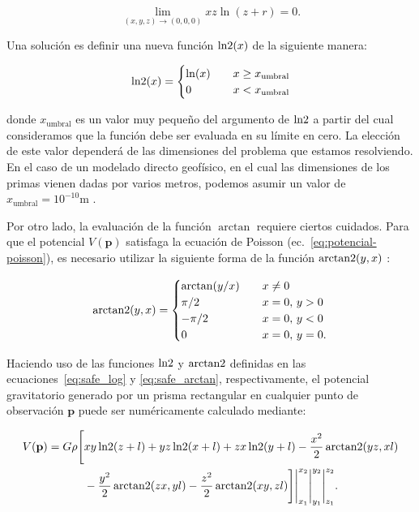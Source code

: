 \begin{equation}
    \lim_{(x, y, z)\rightarrow (0, 0, 0)} xz \ln(z + r) = 0.
\end{equation}

Una solución es definir una nueva función $\operatorname{ln2}(x)$ de la siguiente
manera:

\begin{equation}
    \operatorname{ln2}(x) =
    \begin{cases}
        \ln(x) & \quad x \ge x_\text{umbral} \\
        0      & \quad x < x_\text{umbral}
    \end{cases}
    \label{eq:safe_log}
\end{equation}

\noindent donde $x_\text{umbral}$ es un valor muy pequeño del argumento de
$\operatorname{ln2}$ a partir del cual consideramos que la función debe ser evaluada en
su límite en cero.
La elección de este valor dependerá de las dimensiones del problema que estamos
resolviendo.
En el caso de un modelado directo geofísico, en el cual las dimensiones de los
primas vienen dadas por varios metros, podemos asumir un valor de
$x_\text{umbral} = 10^{-10}$m \citep{harmonica2021}.

Por otro lado, la evaluación de la función $\arctan$ requiere ciertos cuidados.
Para que el potencial $V(\mathbf{p})$ satisfaga la ecuación de Poisson
(ec.~\ref{eq:potencial-poisson}), es necesario utilizar la siguiente forma de
la función $\operatorname{arctan2}(y, x)$ \citep{fukushima2020}:

\begin{equation}
    \operatorname{arctan2}(y, x) =
    \begin{cases}
        \arctan(y / x) & \quad x \ne 0 \\
        \pi / 2        & \quad x = 0,\, y > 0 \\
        -\pi / 2       & \quad x = 0,\, y < 0 \\
        0              & \quad x = 0,\, y = 0.
    \end{cases}
    \label{eq:safe_arctan}
\end{equation}

Haciendo uso de las funciones $\operatorname{ln2}$ y $\operatorname{arctan2}$ definidas en las
ecuaciones~\ref{eq:safe_log} y \ref{eq:safe_arctan}, respectivamente, el
potencial gravitatorio generado por un prisma rectangular en cualquier punto de
observación $\mathbf{p}$ puede ser numéricamente calculado mediante:

\begin{equation}
    \begin{split}
        V(\mathbf{p}) =
        G \rho
        \Bigg[ &
            xy \operatorname{ln2} (z + l)
            + yz \operatorname{ln2}(x + l)
            + zx \operatorname{ln2}(y + l)
           - \frac{x^2}{2} \operatorname{arctan2}(yz, xl)
                \\&
           - \frac{y^2}{2} \operatorname{arctan2}(zx, yl)
           - \frac{z^2}{2} \operatorname{arctan2}(xy, zl)
        \Bigg]
        \Bigg|_{x_1}^{x_2}
        \Bigg|_{y_1}^{y_2}
        \Bigg|_{z_1}^{z_2}.
    \end{split}
    \label{eq:potencial-prismas-numerico}
\end{equation}

